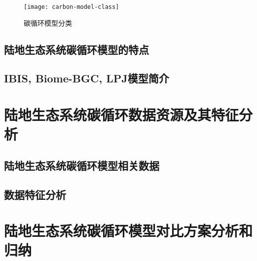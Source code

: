\begin{figure}
    \centering
    \texttt{[image: carbon-model-class]}
    \caption{碳循环模型分类}
    \label{fig:carbon-model-class}
\end{figure}

\subsection{陆地生态系统碳循环模型的特点}

\subsection{IBIS, Biome-BGC, LPJ模型简介}

\section{陆地生态系统碳循环数据资源及其特征分析}
\subsection{陆地生态系统碳循环模型相关数据}
\subsection{数据特征分析}

\section{陆地生态系统碳循环模型对比方案分析和归纳}
